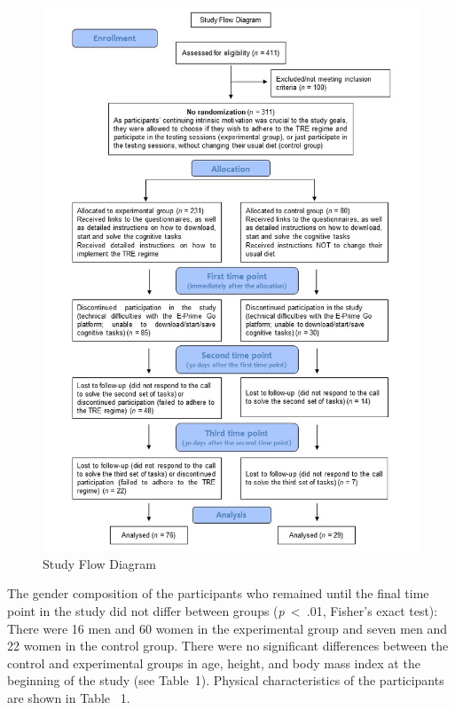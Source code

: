 \documentclass[authordate, empirical,issue]{jote-new-article}
\begin{document}
\begin{figure}
  \begin{fullwidth}

    \centering
    \includegraphics[scale=0.75]{media/image1.jpg}

    \caption{Study Flow Diagram}

    \label{fig:rId8}
  \end{fullwidth}


\end{figure}








The gender composition of the participants who remained until the final time point in the study did not differ between groups (\emph{p~}<~.01, Fisher's exact test): There were 16 men and 60 women in the experimental group and seven men and 22 women in the control group. There were no significant differences between the control and experimental groups in age, height, and body mass index at the beginning of the study (see Table~1). Physical characteristics of the participants are shown in Table ~1.
\end{document}
